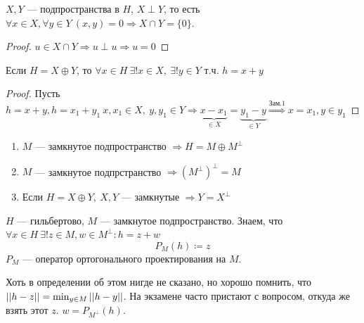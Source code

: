 \documentclass[document]{subfiles}
\begin{document}
\begin{remark}
    \item $X,Y$ --- подпространства в $H$, $X \perp Y$, то есть $\forall x \in X, \forall y \in Y \: (x,y) = 0 \Rightarrow X \cap Y = \{ 0 \}$.
\end{remark}
\begin{proof}
    $u \in X \cap Y \Rightarrow u \perp u \Rightarrow u = 0$
\end{proof}
\begin{remark}
    Если $H = X \oplus Y$, то $\forall x \in H  \: \exists! x \in X, \: \exists! y \in Y$ т.ч. $h = x + y$
\end{remark}
\begin{proof}
    Пусть $h = x + y, h = x_1 + y_1 \: x, x_1 \in X, \: y, y_1 \in Y \Rightarrow \underbrace{x - x_1}_{\in X} = \underbrace{y_1-y}_{\in Y} \stackrel{\text{Зам.1}}{\Rightarrow} x = x_1, y \in y_1$ 
\end{proof}
\begin{corollary}
    \begin{enumerate}
        \item $M$ --- замкнутое подпространство $\Rightarrow H = M \oplus M^\perp$ 
        \item $M$ --- замкнутое подпрстранство $\Rightarrow (M^\perp)^\perp = M $
        \item Если $H = X \oplus Y, \: X, Y$ --- замкнутые $\Rightarrow Y = X^\perp$
    \end{enumerate}
\end{corollary}

\begin{definition}
    $H$ --- гильбертово, $M$ --- замкнутое подпространство. Знаем, что $\forall x \in H \: \exists! z \in M, w \in M^\perp : h = z + w$
    \[ P_M(h) \coloneqq z \]
    $P_M$ --- оператор ортогонального проектирования на $M$. 
\end{definition}

Хоть в определении об этом нигде не сказано, но хорошо помнить, что $\left|\left| {h-z} \right| \right| = \min_{y \in M} \left|\left| {h-y} \right| \right|$.
На экзамене часто пристают с вопросом, откуда же взять этот $z$. $w = P_{M^\perp}(h)$.
\end{document}
